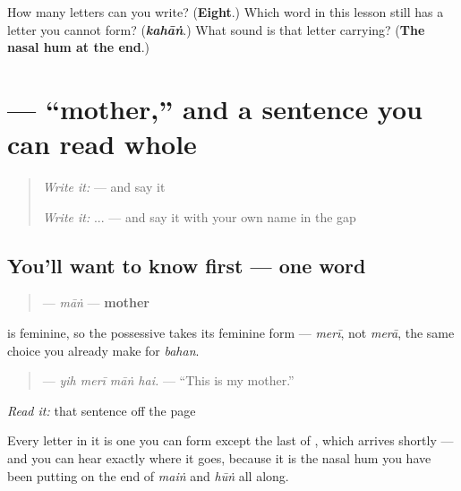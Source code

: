 \begin{tcolorbox}[breakable,colback=teal!4,colframe=teal!35!black,title={Before you move on}]
How many letters can you write? (\textbf{Eight}.) Which word in this lesson still has a letter you cannot form? (\emph{\textbf{kahāṅ}}.) What sound is that letter carrying? (\textbf{The nasal hum at the end}.)
\end{tcolorbox}
\section[\texorpdfstring{\ur{ماں} (māṅ)}{ماں (māṅ)}]{ — \textquotedblleft{}mother,\textquotedblright{} and a sentence you can read whole}

\label{lesson:UR-C17-maan}



\begin{quote}
\emph{Write it:}  — and say it

\emph{Write it:}   ...  — and say it with your own name in the gap
\end{quote}

\subsection*{You'll want to know first — one word}
\begin{quote}
\textbf{} — \emph{māṅ} — \textbf{mother}
\end{quote}

\textbf{} is feminine, so the possessive takes its feminine form — \emph{merī}, not \emph{merā}, the same choice you already make for \emph{bahan}.

\begin{quote}
\textbf{   } — \emph{yih merī māṅ hai.} — \textquotedblleft{}This is my mother.\textquotedblright{}
\end{quote}

\emph{Read it:} that sentence off the page

Every letter in it is one you can form except the last of \textbf{}, which arrives shortly — and you can hear exactly where it goes, because it is the nasal hum you have been putting on the end of \emph{maiṅ} and \emph{hūṅ} all along.

